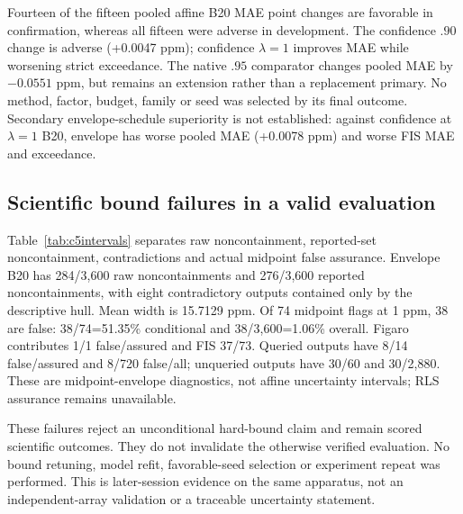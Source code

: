 Fourteen of the fifteen pooled affine B20 MAE point changes are favorable in confirmation, whereas all fifteen were adverse in development. The confidence $.90$ change is adverse (+0.0047 ppm); confidence $\lambda=1$ improves MAE while worsening strict exceedance. The native $.95$ comparator changes pooled MAE by $-0.0551$ ppm, but remains an extension rather than a replacement primary. No method, factor, budget, family or seed was selected by its final outcome. Secondary envelope-schedule superiority is not established: against confidence at $\lambda=1$ B20, envelope has worse pooled MAE (+0.0078 ppm) and worse FIS MAE and exceedance.

\subsection{Scientific bound failures in a valid evaluation}
Table~\ref{tab:c5intervals} separates raw noncontainment, reported-set noncontainment, contradictions and actual midpoint false assurance. Envelope B20 has 284/3,600 raw noncontainments and 276/3,600 reported noncontainments, with eight contradictory outputs contained only by the descriptive hull. Mean width is 15.7129 ppm. Of 74 midpoint flags at 1 ppm, 38 are false: 38/74=51.35\% conditional and 38/3,600=1.06\% overall. Figaro contributes 1/1 false/assured and FIS 37/73. Queried outputs have 8/14 false/assured and 8/720 false/all; unqueried outputs have 30/60 and 30/2,880. These are midpoint-envelope diagnostics, not affine uncertainty intervals; RLS assurance remains unavailable.



These failures reject an unconditional hard-bound claim and remain scored scientific outcomes. They do not invalidate the otherwise verified evaluation. No bound retuning, model refit, favorable-seed selection or experiment repeat was performed. This is later-session evidence on the same apparatus, not an independent-array validation or a traceable uncertainty statement.
